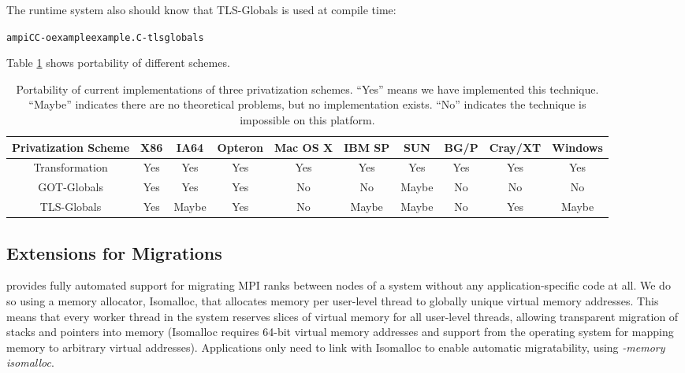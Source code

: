 \documentclass[10pt]{article}
\begin{document}
The runtime system also should know that TLS-Globals is used at compile time:

\begin{alltt}
ampiCC -o example example.C -tlsglobals
\end{alltt}
Table \ref{tab:portability} shows portability of different schemes.

\begin{table}[!t]
\begin{center}
\begin{tabular}{|c||c|c|c|c|c|c|c|c|c|}
\hline
Privatization
Scheme     & X86 & IA64 & Opteron & Mac OS X & IBM SP & SUN & BG/P & Cray/XT & Windows \\
		   \hline
		   \hline
		   Transformation  & Yes  & Yes   & Yes     & Yes     & Yes  & Yes  & Yes & Yes & Yes  \\
			   \hline
			   GOT-Globals  & Yes  & Yes  & Yes     & No       & No    & Maybe  & No  & No  & No \\
				   \hline
				   TLS-Globals  &  Yes & Maybe  & Yes     & No    & Maybe & Maybe & No  & Yes & Maybe  \\
					   \hline
					   \end{tabular}
					   \caption{Portability of current implementations of three privatization schemes.
						   ``Yes'' means we have implemented this technique.
							   ``Maybe'' indicates there are no theoretical problems, but no implementation exists.
							   ``No'' indicates the technique is impossible on this platform.}
							   \label{tab:portability}
							   \vspace{-1.0cm}
							   \end{center}
							   \end{table}
\subsection{Extensions for Migrations}

\ampi{} provides fully automated support for migrating MPI ranks between nodes of a
system without any application-specific code at all. We do so using a memory
allocator, Isomalloc, that allocates memory per user-level thread to globally
unique virtual memory addresses. This means that every worker thread in the system
reserves slices of virtual memory for all user-level threads, allowing transparent migration
of stacks and pointers into memory (Isomalloc requires 64-bit virtual memory
addresses and support from the operating system for mapping memory to arbitrary
virtual addresses). Applications only need to link with Isomalloc to enable
automatic migratability, using \emph{-memory isomalloc}.
\end{document}

